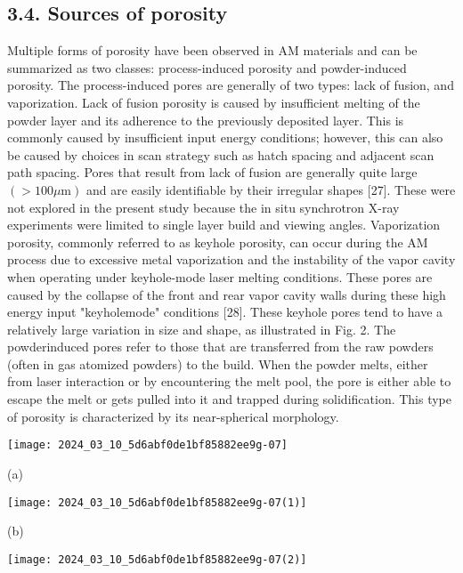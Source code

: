 \documentclass[10pt]{article}
\begin{document}
\subsection*{3.4. Sources of porosity}
Multiple forms of porosity have been observed in AM materials and can be summarized as two classes: process-induced porosity and powder-induced porosity. The process-induced pores are generally of two types: lack of fusion, and vaporization. Lack of fusion porosity is caused by insufficient melting of the powder layer and its adherence to the previously deposited layer. This is commonly caused by insufficient input energy conditions; however, this can also be caused by choices in scan strategy such as hatch spacing and adjacent scan path spacing. Pores that result from lack of fusion are generally quite large $(>100 \mu \mathrm{m})$ and are easily identifiable by their irregular shapes [27]. These were not explored in the present study because the in situ synchrotron X-ray experiments were limited to single layer build and viewing angles. Vaporization porosity, commonly referred to as keyhole porosity, can occur during the AM process due to excessive metal vaporization and the instability of the vapor cavity when operating under keyhole-mode laser melting conditions. These pores are caused by the collapse of the front and rear vapor cavity walls during these high energy input "keyholemode" conditions [28]. These keyhole pores tend to have a relatively large variation in size and shape, as illustrated in Fig. 2. The powderinduced pores refer to those that are transferred from the raw powders (often in gas atomized powders) to the build. When the powder melts, either from laser interaction or by encountering the melt pool, the pore is either able to escape the melt or gets pulled into it and trapped during solidification. This type of porosity is characterized by its near-spherical morphology.

\begin{center}
\texttt{[image: 2024\_03\_10\_5d6abf0de1bf85882ee9g-07]}
\end{center}

(a)

\begin{center}
\texttt{[image: 2024\_03\_10\_5d6abf0de1bf85882ee9g-07(1)]}
\end{center}

(b)

\begin{center}
\texttt{[image: 2024\_03\_10\_5d6abf0de1bf85882ee9g-07(2)]}
\end{center}
\end{document}
